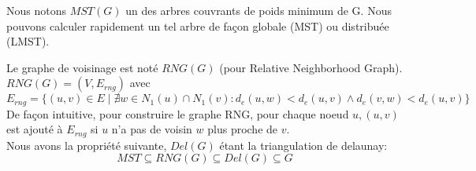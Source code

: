 \begin{mydef}
 Nous notons $MST(G)$ un des arbres couvrants de poids minimum de G. Nous pouvons calculer rapidement un tel arbre de façon globale (MST) ou distribuée (LMST).


\end{mydef}

\begin{mydef}
 Le graphe de voisinage est noté $RNG(G)$ (pour Relative Neighborhood Graph).\\
 $RNG(G)=(V,E_{rng})$ avec $$E_{rng}=\{ (u,v)\in E \mid \nexists w\in N_1(u)\cap N_1(v): d_e(u,w)<d_e(u,v) \wedge d_e(v,w)<d_e(u,v)  \}$$
 De façon intuitive, pour construire le graphe RNG, pour chaque noeud $u,(u,v)$ est ajouté à $E_{rng}$ si $u$ n'a pas de voisin $w$ plus proche de $v$.\\
 Nous avons la propriété suivante, $Del(G)$ étant la triangulation de delaunay: $$  MST\subseteq RNG(G)\subseteq Del(G) \subseteq G$$

\end{mydef}

